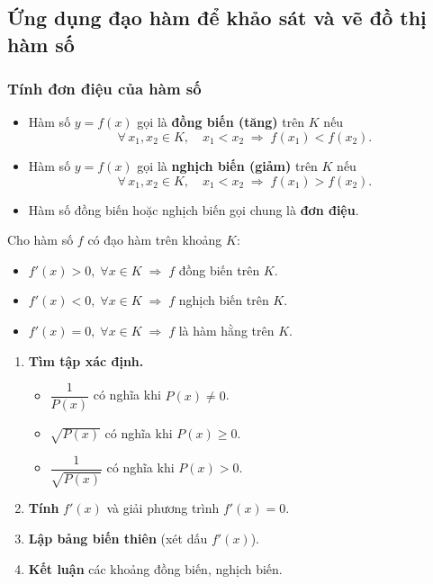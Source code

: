 \documentclass[12pt,a4paper]{article}
\begin{document}
\subsection{Ứng dụng đạo hàm để khảo sát và vẽ đồ thị hàm số}

\subsubsection{Tính đơn điệu của hàm số}

\begin{dinhnghia}
  \begin{itemize}
    \item Hàm số $y = f(x)$ gọi là \textbf{đồng biến (tăng)} trên $K$ nếu
      \[
        \forall\, x_1, x_2 \in K,\quad x_1 < x_2 \;\Rightarrow\; f(x_1) < f(x_2).
      \]
    \item Hàm số $y = f(x)$ gọi là \textbf{nghịch biến (giảm)} trên $K$ nếu
      \[
        \forall\, x_1, x_2 \in K,\quad x_1 < x_2 \;\Rightarrow\; f(x_1) > f(x_2).
      \]
    \item Hàm số đồng biến hoặc nghịch biến gọi chung là \textbf{đơn điệu}.
  \end{itemize}
\end{dinhnghia}

\begin{dinhly}[title={Điều kiện đủ xét tính đơn điệu}]
  Cho hàm số $f$ có đạo hàm trên khoảng $K$:
  \begin{itemize}
    \item $f'(x) > 0,\;\forall x \in K \;\Rightarrow\; f$ đồng biến trên $K$.
    \item $f'(x) < 0,\;\forall x \in K \;\Rightarrow\; f$ nghịch biến trên $K$.
    \item $f'(x) = 0,\;\forall x \in K \;\Rightarrow\; f$ là hàm hằng trên $K$.
  \end{itemize}
\end{dinhly}

\begin{phuongphap}[title={Các bước xét tính đơn điệu}]
  \begin{enumerate}
    \item \textbf{Tìm tập xác định.}
      \begin{itemize}
        \item $\dfrac{1}{P(x)}$ có nghĩa khi $P(x) \ne 0$.
        \item $\sqrt{P(x)}$ có nghĩa khi $P(x) \ge 0$.
        \item $\dfrac{1}{\sqrt{P(x)}}$ có nghĩa khi $P(x) > 0$.
      \end{itemize}
    \item \textbf{Tính} $f'(x)$ và giải phương trình $f'(x) = 0$.
    \item \textbf{Lập bảng biến thiên} (xét dấu $f'(x)$).
    \item \textbf{Kết luận} các khoảng đồng biến, nghịch biến.
  \end{enumerate}
\end{phuongphap}
\end{document}
